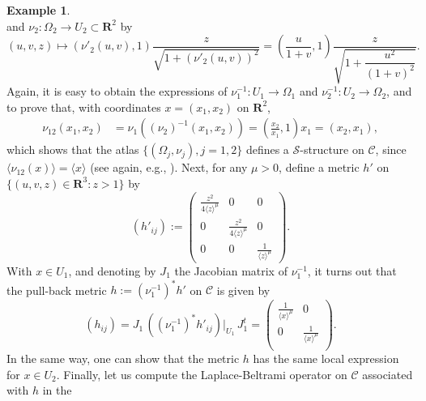 \documentclass[12pt,a4paper,reqno]{amsart}
\numberwithin{equation}{section}
\numberwithin{thm}{section}
\theoremstyle{definition}
\newtheorem{example}[thm]{Example}
\theoremstyle{remark}
\begin{document}
\begin{example}
\begin{equation*}
\end{equation*}
and $\nu_2 : \Omega_2  \rightarrow  U_2 \subset {\mathbf R^{{2}}}$ by
\begin{equation*}
(u,v,z)  \mapsto (\nu'_2(u,v) , 1) \frac{z}{\sqrt{1 + (\nu'_2(u,v))^2}} = \left(\frac{u}{1+v} , 1\right) \frac{z}{\sqrt{1 + \dfrac{u^2}{(1+v)^2}}}.
\end{equation*}
\noindent Again, it is easy to obtain the expressions of $\nu_1^{-1} : U_1  \rightarrow  \Omega_1$
and $\nu_2^{-1} : U_2  \rightarrow  \Omega_2$, and to prove that, with coordinates $x=(x_1,x_2)$ on ${\mathbf R^{{2}}}$,
\begin{equation*}
\begin{split}
\nu_{12}(x_1,x_2)  &  = \nu_1((\nu_2)^{-1}(x_1,x_2))
 = \left(\frac{x_2}{x_1},1\right) x_1 =(x_2 , x_1),
\end{split}
\end{equation*}
which shows that the atlas $\{(\Omega_j, \nu_j), j=1,2\}$ defines a ${\mathscr{S}}$-structure on ${\mathcal{C}}$,
since ${\langle{\nu_{12}(x)}\rangle}={\langle{x}\rangle}$ (see again, e.g., \cite{Co,Sc}).
Next, for any $\mu>0$, define a metric $h'$ on $\{(u,v,z) \in {\mathbf R^{{3}}} : z > 1\}$ by
\begin{equation*}
(h'_{ij}) := \left(
\begin{array}{ccc}
\displaystyle \frac{z^2}{4 {\langle {z} \rangle}^\mu} & 0 & 0 \\
0 & \displaystyle \frac{z^2}{4 {\langle {z} \rangle}^\mu} & 0 \\
0 & 0 & \displaystyle\frac{1}{ {\langle {z} \rangle}^\mu}
\end{array} \right). 
\end{equation*}
With $x \in U_1$, and denoting by $J_1$ the Jacobian matrix of $\nu_1^{-1}$,
it turns out that the pull-back metric $h := (\nu_1^{-1})^* h'$ on ${\mathcal{C}}$ is given by
\begin{equation*}
(h_{ij}) =  J_1 \, ((\nu_1^{-1})^*h'_{ij})|_{U_1}\, J_1^t = \left(
\begin{array}{cc}
\displaystyle \frac{1}{ {\langle {x} \rangle}^\mu} & 0  \\
0 & \displaystyle \frac{1}{ {\langle {x} \rangle}^\mu} \\
\end{array} \right).
\end{equation*}
In the same way, one can show that the metric $h$ has the same local expression for $x \in U_2$. Finally, let us compute the Laplace-Beltrami operator on ${\mathcal{C}}$ associated with $h$ in the

\end{example}
\end{document}

